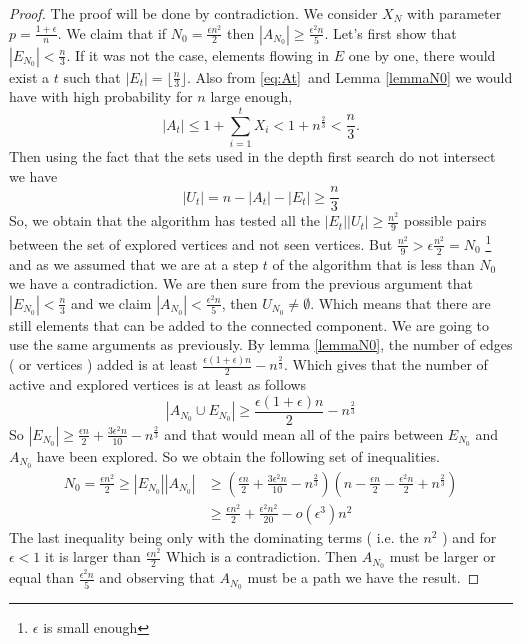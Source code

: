\begin{proof}
	The proof will be done by contradiction.
	\newline
	We consider $X_N$ with parameter $p = \frac{1+\epsilon}{n}$. We claim that if $N_0 = \frac{\epsilon n^2}{2}$ then $|A_{N_0}| \geq \frac{\epsilon^2 n}{5}$.
	\newline
	Let's first show that $|E_{N_0}| < \frac{n}{3}$.
	\newline
	If it was not the case, elements flowing in $E$ one by one, there would exist a $t$ such that $|E_t| = \lfloor\frac{n}{3}\rfloor$. Also from \eqref{eq:At} and Lemma \ref{lemmaN0} we would have with high probability for $n$ large enough,
	\begin{equation}
		|A_t| \leq 1 + \sum_{i=1}^{t} X_i < 1 + n^{\frac{2}{3}} < \frac{n}{3}.
	\end{equation}
	Then using the fact that the sets used in the depth first search do not intersect we have
	\begin{equation}
		|U_t| = n - |A_t| - |E_t| \geq \frac{n}{3}
	\end{equation}
	So, we obtain that the algorithm has tested all the $|E_t||U_t| \geq \frac{n^2}{9}$ possible pairs between the set of explored vertices and not seen vertices.
	But $\frac{n^2}{9} > \epsilon\frac{n^2}{2} = N_0$ \footnote{ $\epsilon$ is small enough} and as we assumed that we are at a step $t$ of the algorithm that is less than $N_0$ we have a contradiction. 
	\newline
	We are then sure from the previous argument that $|E_{N_0}| < \frac{n}{3}$ and we claim $|A_{N_0}| < \frac{\epsilon^2 n}{5}$, then $U_{N_0} \neq \emptyset$. 
	Which means that there are still elements that can be added to the connected component.
	We are going to use the same arguments as previously.
	\newline
	By lemma \eqref{lemmaN0}, the number of edges ( or vertices ) added is at least $\frac{\epsilon(1+\epsilon)n}{2} - n^{\frac{2}{3}}$.
	Which gives that the number of active and explored vertices is at least as follows
	\begin{equation}
		|A_{N_0} \cup E_{N_0}| \geq \frac{\epsilon(1+\epsilon)n}{2} - n^{\frac{2}{3}}
	\end{equation}
	So $|E_{N_0}| \geq \frac{\epsilon n}{2} + \frac{3\epsilon^2n}{10} - n^{\frac{2}{3}}$ and that would mean all of the pairs between $E_{N_0}$ and $A_{N_0}$ have been explored.
	So we obtain the following set of inequalities.
	\begin{align}
		N_0 = \frac{\epsilon n^2}{2} \geq |E_{N_0}||A_{N_0}| &\geq (\frac{\epsilon n}{2} + \frac{3\epsilon^2n}{10} - n^{\frac{2}{3}} )
									(n - \frac{\epsilon n}{2} - \frac{\epsilon^2 n}{2} + n^{\frac{2}{3}})\\
									&\geq \frac{\epsilon n^2}{2} + \frac{\epsilon ^2 n^2 }{20} - o(\epsilon ^3)n^2 			
	\end{align}
	The last inequality being only with the dominating terms ( i.e. the $n^2$ ) and for $\epsilon < 1$ it is larger than $\frac{\epsilon n^2}{2}$ Which is a contradiction.
	Then $A_{N_0}$ must be larger or equal than $\frac{\epsilon ^2n}{5}$ and observing that $A_{N_0}$ must be a path we have the result.
\end{proof}

